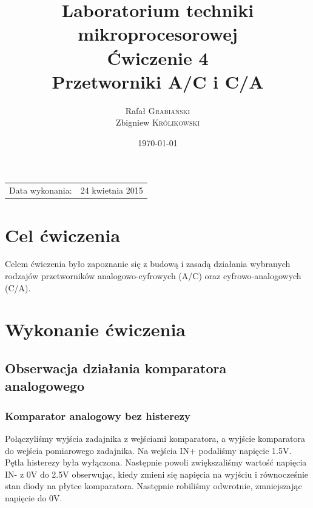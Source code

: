 \documentclass{article}
\title{Laboratorium techniki mikroprocesorowej \\ Ćwiczenie 4 \\ Przetworniki A/C i C/A} %
\author{Rafał \textsc{Grabiański} \\ Zbigniew \textsc{Królikowski}} %
\date{\today} %
\begin{document}
\maketitle %

\begin{center}
\begin{tabular}{l r}
Data wykonania: & 24 kwietnia 2015 \\ %
\end{tabular}
\end{center}



\section{Cel ćwiczenia}
Celem ćwiczenia było zapoznanie się z budową i zasadą działania wybranych rodzajów przetworników
analogowo-cyfrowych (A/C) oraz cyfrowo-analogowych (C/A).
 

\section{Wykonanie ćwiczenia}

\subsection{Obserwacja działania komparatora analogowego}
\subsubsection{Komparator analogowy bez histerezy}
Połączyliśmy wyjścia zadajnika z wejściami komparatora, a wyjście komparatora do wejścia pomiarowego
zadajnika. Na wejścia IN+ podaliśmy napięcie 1.5V. Pętla histerezy była wyłączona. Następnie powoli zwiększaliśmy
wartość napięcia IN- z 0V do 2.5V obserwując, kiedy zmieni się napięcia na wyjściu i równocześnie stan diody na płytce
komparatora. Następnie robiliśmy odwrotnie, zmniejszając napięcie do 0V.
\end{document}
